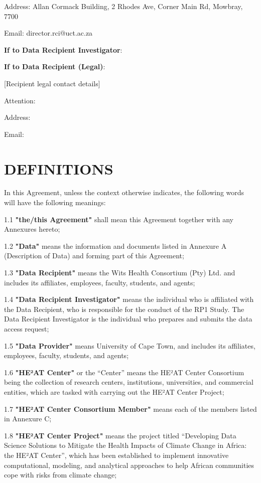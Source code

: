 \documentclass[12pt,letterpaper]{article}
\begin{document}
Address: Allan Cormack Building, 2 Rhodes Ave, Corner Main Rd, Mowbray, 7700

Email: director.rci@uct.ac.za

\textbf{If to Data Recipient Investigator}:

\textbf{If to Data Recipient (Legal)}:

[Recipient legal contact details]

Attention:

Address:

Email:

\section{DEFINITIONS}

In this Agreement, unless the context otherwise indicates, the following words will have the following meanings:

1.1 \textbf{"the/this Agreement"} shall mean this Agreement together with any Annexures hereto;

1.2 \textbf{"Data"} means the information and documents listed in Annexure A (Description of Data) and forming part of this Agreement;

1.3 \textbf{"Data Recipient"} means the Wits Health Consortium (Pty) Ltd. and includes its affiliates, employees, faculty, students, and agents;

1.4 \textbf{"Data Recipient Investigator"} means the individual who is affiliated with the Data Recipient, who is responsible for the conduct of the RP1 Study. The Data Recipient Investigator is the individual who prepares and submits the data access request;

1.5 \textbf{"Data Provider"} means University of Cape Town, and includes its affiliates, employees, faculty, students, and agents;

1.6 \textbf{"HE²AT Center"} or the ``Center'' means the HE²AT Center Consortium being the collection of research centers, institutions, universities, and commercial entities, which are tasked with carrying out the HE²AT Center Project;

1.7 \textbf{"HE²AT Center Consortium Member"} means each of the members listed in Annexure C;

1.8 \textbf{"HE²AT Center Project"} means the project titled ``Developing Data Science Solutions to Mitigate the Health Impacts of Climate Change in Africa: the HE²AT Center'', which has been established to implement innovative computational, modeling, and analytical approaches to help African communities cope with risks from climate change;
\end{document}
